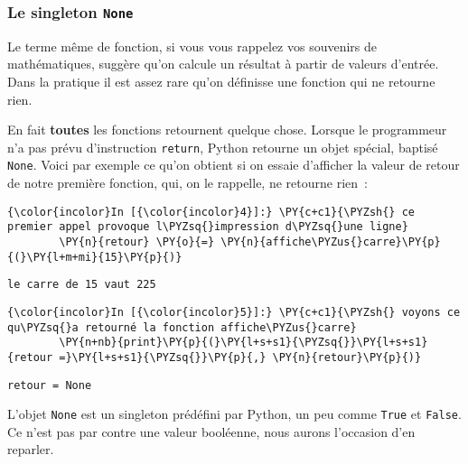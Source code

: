     \hypertarget{le-singleton-none}{%
\subsubsection{\texorpdfstring{Le singleton
\texttt{None}}{Le singleton None}}\label{le-singleton-none}}

    Le terme même de fonction, si vous vous rappelez vos souvenirs de
mathématiques, suggère qu'on calcule un résultat à partir de valeurs
d'entrée. Dans la pratique il est assez rare qu'on définisse une
fonction qui ne retourne rien.

    En fait \textbf{toutes} les fonctions retournent quelque chose. Lorsque
le programmeur n'a pas prévu d'instruction \texttt{return}, Python
retourne un objet spécial, baptisé \texttt{None}. Voici par exemple ce
qu'on obtient si on essaie d'afficher la valeur de retour de notre
première fonction, qui, on le rappelle, ne retourne rien~:

    \begin{Verbatim}[commandchars=\\\{\}]
{\color{incolor}In [{\color{incolor}4}]:} \PY{c+c1}{\PYZsh{} ce premier appel provoque l\PYZsq{}impression d\PYZsq{}une ligne}
        \PY{n}{retour} \PY{o}{=} \PY{n}{affiche\PYZus{}carre}\PY{p}{(}\PY{l+m+mi}{15}\PY{p}{)}
\end{Verbatim}


    \begin{Verbatim}[commandchars=\\\{\}]
le carre de 15 vaut 225

    \end{Verbatim}

    \begin{Verbatim}[commandchars=\\\{\}]
{\color{incolor}In [{\color{incolor}5}]:} \PY{c+c1}{\PYZsh{} voyons ce qu\PYZsq{}a retourné la fonction affiche\PYZus{}carre}
        \PY{n+nb}{print}\PY{p}{(}\PY{l+s+s1}{\PYZsq{}}\PY{l+s+s1}{retour =}\PY{l+s+s1}{\PYZsq{}}\PY{p}{,} \PY{n}{retour}\PY{p}{)}
\end{Verbatim}


    \begin{Verbatim}[commandchars=\\\{\}]
retour = None

    \end{Verbatim}

    L'objet \texttt{None} est un singleton prédéfini par Python, un peu
comme \texttt{True} et \texttt{False}. Ce n'est pas par contre une
valeur booléenne, nous aurons l'occasion d'en reparler.

